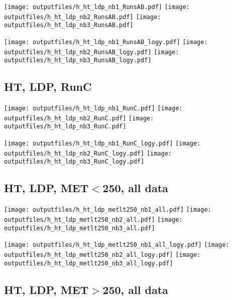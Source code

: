 \documentclass[11pt]{article}
\begin{document}
    \noindent
     \texttt{[image: outputfiles/h\_ht\_ldp\_nb1\_RunsAB.pdf]}
     \texttt{[image: outputfiles/h\_ht\_ldp\_nb2\_RunsAB.pdf]}
     \texttt{[image: outputfiles/h\_ht\_ldp\_nb3\_RunsAB.pdf]}

    \noindent
     \texttt{[image: outputfiles/h\_ht\_ldp\_nb1\_RunsAB\_logy.pdf]}
     \texttt{[image: outputfiles/h\_ht\_ldp\_nb2\_RunsAB\_logy.pdf]}
     \texttt{[image: outputfiles/h\_ht\_ldp\_nb3\_RunsAB\_logy.pdf]}

    \subsection{ HT, LDP, RunC}

    \noindent
     \texttt{[image: outputfiles/h\_ht\_ldp\_nb1\_RunC.pdf]}
     \texttt{[image: outputfiles/h\_ht\_ldp\_nb2\_RunC.pdf]}
     \texttt{[image: outputfiles/h\_ht\_ldp\_nb3\_RunC.pdf]}

    \noindent
     \texttt{[image: outputfiles/h\_ht\_ldp\_nb1\_RunC\_logy.pdf]}
     \texttt{[image: outputfiles/h\_ht\_ldp\_nb2\_RunC\_logy.pdf]}
     \texttt{[image: outputfiles/h\_ht\_ldp\_nb3\_RunC\_logy.pdf]}


    \subsection{ HT, LDP, MET$<$250, all data}

    \noindent
     \texttt{[image: outputfiles/h\_ht\_ldp\_metlt250\_nb1\_all.pdf]}
     \texttt{[image: outputfiles/h\_ht\_ldp\_metlt250\_nb2\_all.pdf]}
     \texttt{[image: outputfiles/h\_ht\_ldp\_metlt250\_nb3\_all.pdf]}

    \noindent
     \texttt{[image: outputfiles/h\_ht\_ldp\_metlt250\_nb1\_all\_logy.pdf]}
     \texttt{[image: outputfiles/h\_ht\_ldp\_metlt250\_nb2\_all\_logy.pdf]}
     \texttt{[image: outputfiles/h\_ht\_ldp\_metlt250\_nb3\_all\_logy.pdf]}


    \subsection{ HT, LDP, MET$>$250, all data}
\end{document}
